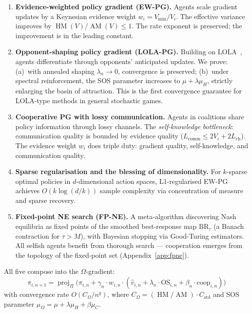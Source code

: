 \documentclass[a4paper,oneside,11pt]{report}
\DeclareMathOperator{\proj}{proj}
\begin{document}
\begin{enumerate}
    \item \textbf{Evidence-weighted policy gradient (EW-PG).} Agents scale gradient updates by a Keynesian evidence weight $w_i = V_{\min}/V_i$. The effective variance improves by $\operatorname{HM}(V)/\operatorname{AM}(V) \leq 1$. The rate exponent is preserved; the improvement is in the leading constant.

    \item \textbf{Opponent-shaping policy gradient (LOLA-PG).} Building on LOLA~\cite{foerster2018lola}, agents differentiate through opponents' anticipated updates. We prove: (a)~with annealed shaping $\lambda_n \to 0$, convergence is preserved; (b)~under spectral reinforcement, the SOS parameter increases to $\mu + \lambda\mu_H$, strictly enlarging the basin of attraction. This is the first convergence guarantee for LOLA-type methods in general stochastic games.

    \item \textbf{Cooperative PG with lossy communication.} Agents in coalitions share policy information through lossy channels. The \emph{self-knowledge bottleneck}: communication quality is bounded by evidence quality ($L_{\text{comm}} \leq 2V_i + 2L_{\text{ch}}$). The evidence weight $w_i$ does triple duty: gradient quality, self-knowledge, and communication quality.

    \item \textbf{Sparse regularisation and the blessing of dimensionality.} For $k$-sparse optimal policies in $d$-dimensional action spaces, L1-regularised EW-PG achieves $O(k \log(d/k))$ sample complexity via concentration of measure and sparse recovery.

    \item \textbf{Fixed-point NE search (FP-NE).} A meta-algorithm discovering Nash equilibria as fixed points of the smoothed best-response map $\mathrm{BR}_\tau$ (a Banach contraction for $\tau > M$), with Bayesian stopping via Good-Turing estimators. All selfish agents benefit from thorough search --- cooperation emerges from the topology of the fixed-point set (Appendix~\ref{app:fpne}).
\end{enumerate}

All five compose into the $\Omega$-gradient:
\begin{equation}
    \pi_{i,n+1} = \proj_\Pi\bigl(\pi_{i,n} + \gamma_n \cdot w_{i,n} \cdot (\hat{v}_{i,n} + \lambda_n \cdot \text{OS}_{i,n} + \beta_n \cdot \text{coop}_{i,n})\bigr)
\end{equation}
with convergence rate $O(C_\Omega / n^q)$, where $C_\Omega = (\operatorname{HM}/\operatorname{AM}) \cdot C_{\text{std}}$ and SOS parameter $\mu_\Omega = \mu + \lambda\mu_H + \beta\mu_C$.
\end{document}
